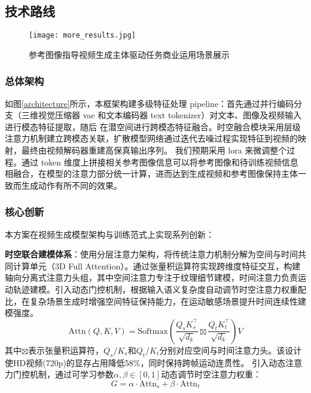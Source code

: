 \subsection{技术路线}

\begin{figure}[htbp]
  \centering
  \texttt{[image: more\_results.jpg]}
  \caption{参考图像指导视频生成主体驱动任务商业运用场景展示}
  \label{fig:3}
\end{figure}
\subsubsection{总体架构}
如图\ref{architecture}所示，本框架构建多级特征处理 pipeline：首先通过并行编码分支（三维视觉压缩器 vae 和文本编码器 text tokenizer）对文本、图像及视频输入进行模态特征提取，随后
在潜空间进行跨模态特征融合。时空融合模块采用层级注意力机制建立跨模态关联，扩散模型网络通过迭代去噪过程实现特征到视频的映射，最终由视频解码器重建高保真输出序列。
我们预期采用 lora 来微调整个过程。通过 token 维度上拼接相关参考图像信息可以将参考图像和待训练视频信息相融合，在模型的注意力部分统一计算，进而达到生成视频和参考图像保持主体一致而生成动作有所不同的效果。


\subsubsection{核心创新}

本方案在视频生成模型架构与训练范式上实现系列创新：

\textbf{时空联合建模体系}：使用分层注意力架构，将传统注意力机制分解为空间与时间共同计算单元（3D Full Attention）。通过张量积运算符实现跨维度特征交互，构建轴向分离式注意力头组，其中空间注意力专注于纹理细节建模，时间注意力负责运动轨迹建模。引入动态门控机制，根据输入语义复杂度自动调节时空注意力权重配比，在复杂场景生成时增强空间特征保持能力，在运动敏感场景提升时间连续性建模强度。
\begin{equation}
\text{Attn}(Q,K,V) = \text{Softmax}\left(\frac{Q_s K_s^\top}{\sqrt{d_k}} \boxtimes \frac{Q_t K_t^\top}{\sqrt{d_k}}\right) V
\end{equation}
其中$\boxtimes$表示张量积运算符，$Q_s/K_s$和$Q_t/K_t$分别对应空间与时间注意力头。该设计使HD视频(720p)的显存占用降低58\%，同时保持跨帧运动连贯性。
引入动态注意力门控机制，通过可学习参数$\alpha,\beta\in[0,1]$动态调节时空注意力权重：
\begin{equation}
G = \alpha \cdot \text{Attn}_s + \beta \cdot \text{Attn}_t
\end{equation}

